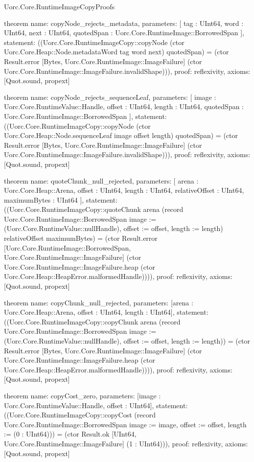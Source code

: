 \begin{lexlean}{Uorc.Core.RuntimeImageCopyProofs}
\begin{semanticmodule}
theorem{
  name: copyNode_rejects_metadata,
  parameters: [
    tag : UInt64,
    word : UInt64,
    next : UInt64,
    quotedSpan : Uorc.Core.RuntimeImage::BorrowedSpan
  ],
  statement: ((Uorc.Core.RuntimeImageCopy::copyNode (ctor Uorc.Core.Heap::Node.metadataWord tag word next) quotedSpan) = (ctor Result.error [Bytes, Uorc.Core.RuntimeImage::ImageFailure] (ctor Uorc.Core.RuntimeImage::ImageFailure.invalidShape))),
  proof: reflexivity{},
  axioms: [Quot.sound, propext]
}

theorem{
  name: copyNode_rejects_sequenceLeaf,
  parameters: [
    image : Uorc.Core.RuntimeValue::Handle,
    offset : UInt64,
    length : UInt64,
    quotedSpan : Uorc.Core.RuntimeImage::BorrowedSpan
  ],
  statement: ((Uorc.Core.RuntimeImageCopy::copyNode (ctor Uorc.Core.Heap::Node.sequenceLeaf image offset length) quotedSpan) = (ctor Result.error [Bytes, Uorc.Core.RuntimeImage::ImageFailure] (ctor Uorc.Core.RuntimeImage::ImageFailure.invalidShape))),
  proof: reflexivity{},
  axioms: [Quot.sound, propext]
}

theorem{
  name: quoteChunk_null_rejected,
  parameters: [
    arena : Uorc.Core.Heap::Arena,
    offset : UInt64,
    length : UInt64,
    relativeOffset : UInt64,
    maximumBytes : UInt64
  ],
  statement: ((Uorc.Core.RuntimeImageCopy::quoteChunk arena (record Uorc.Core.RuntimeImage::BorrowedSpan {image := (Uorc.Core.RuntimeValue::nullHandle), offset := offset, length := length}) relativeOffset maximumBytes) = (ctor Result.error [Uorc.Core.RuntimeImage::BorrowedSpan, Uorc.Core.RuntimeImage::ImageFailure] (ctor Uorc.Core.RuntimeImage::ImageFailure.heap (ctor Uorc.Core.Heap::HeapError.malformedHandle)))),
  proof: reflexivity{},
  axioms: [Quot.sound, propext]
}

theorem{
  name: copyChunk_null_rejected,
  parameters: [arena : Uorc.Core.Heap::Arena, offset : UInt64, length : UInt64],
  statement: ((Uorc.Core.RuntimeImageCopy::copyChunk arena (record Uorc.Core.RuntimeImage::BorrowedSpan {image := (Uorc.Core.RuntimeValue::nullHandle), offset := offset, length := length})) = (ctor Result.error [Bytes, Uorc.Core.RuntimeImage::ImageFailure] (ctor Uorc.Core.RuntimeImage::ImageFailure.heap (ctor Uorc.Core.Heap::HeapError.malformedHandle)))),
  proof: reflexivity{},
  axioms: [Quot.sound, propext]
}

theorem{
  name: copyCost_zero,
  parameters: [image : Uorc.Core.RuntimeValue::Handle, offset : UInt64],
  statement: ((Uorc.Core.RuntimeImageCopy::copyCost (record Uorc.Core.RuntimeImage::BorrowedSpan {image := image, offset := offset, length := (0 : UInt64)})) = (ctor Result.ok [UInt64, Uorc.Core.RuntimeImage::ImageFailure] (1 : UInt64))),
  proof: reflexivity{},
  axioms: [Quot.sound, propext]
}


\end{semanticmodule}
\end{lexlean}
